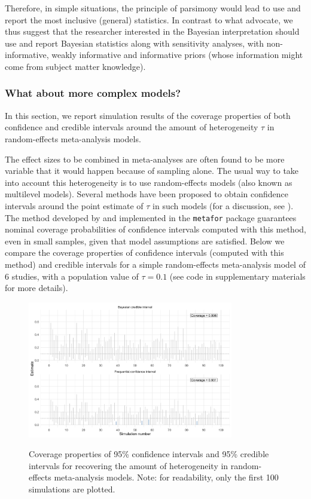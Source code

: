 \documentclass[a4paper,man,natbib,floatsintext,donotrepeattitle]{apa6}
\begin{document}
Therefore, in simple situations, the principle of parsimony would lead to use and report the most inclusive (general) statistics. In contrast to what \cite{albers_credible_2018} advocate, we thus suggest that the researcher interested in the Bayesian interpretation should use and report Bayesian statistics along with sensitivity analyses, with non-informative, weakly informative and informative priors (whose information might come from subject matter knowledge).

\subsubsection{What about more complex models?}

In this section, we report simulation results of the coverage properties of both confidence and credible intervals around the amount of heterogeneity $\tau$ in random-effects meta-analysis models.

The effect sizes to be combined in meta-analyses are often found to be more variable that it would happen because of sampling alone. The usual way to take into account this heterogeneity is to use random-effects models (also known as multilevel models). Several methods have been proposed to obtain confidence intervals around the point estimate of $\tau$ in such models (for a discussion, see \citealp{williams_bayesian_2018}). The method developed by \cite{paule_consensus_1982} and implemented in the \texttt{metafor} package \citep{viechtbauer_conducting_2010} guarantees nominal coverage probabilities of confidence intervals computed with this method, even in small samples, given that model assumptions are satisfied. Below we compare the coverage properties of confidence intervals (computed with this method) and credible intervals for a simple random-effects meta-analysis model of 6 studies, with a population value of $\tau = 0.1$ (see code in supplementary materials for more details).

\begin{figure}[H]
  \caption{Coverage properties of 95\% confidence intervals and 95\% credible intervals for recovering the amount of heterogeneity in random-effects meta-analysis models. Note: for readability, only the first 100 simulations are plotted.}
  \centering
  \includegraphics[width=0.8\textwidth]{coverage2.png}
  \label{fig:coverage2}
\end{figure}
\end{document}
